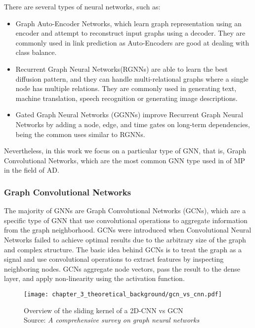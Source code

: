 There are several types of neural networks, such as:

\begin{itemize}
	
	\item Graph Auto-Encoder Networks, which learn graph representation using an encoder and attempt to reconstruct input graphs using a decoder. They are commonly used in link prediction as Auto-Encoders are good at dealing with class balance. 
	
	\item Recurrent Graph Neural Networks(RGNNs) are able to learn the best diffusion pattern, and they can handle multi-relational graphs where a single node has multiple relations. They are commonly used in generating text, machine translation, speech recognition or generating image descriptions.
	
	\item Gated Graph Neural Networks (GGNNs) improve Recurrent Graph Neural Networks by adding a node, edge, and time gates on long-term dependencies, being the common uses similar to RGNNs.
	
\end{itemize}

Nevertheless, in this work we focus on a particular type of GNN, that is, Graph Convolutional Networks, which are the most common GNN type used in of \ac{MP} in the field of \ac{AD}.

\subsubsection{Graph Convolutional Networks}
\label{subsubsec:3_gcns}

The majority of GNNs are Graph Convolutional Networks (GCNs), which are a specific type of GNN that use convolutional operations to aggregate information from the graph neighborhood. GCNs were introduced when Convolutional Neural Networks failed to achieve optimal results due to the arbitrary size of the graph and complex structure. The basic idea behind GCNs is to treat the graph as a signal and use convolutional operations to extract features by inspecting neighboring nodes. GCNs aggregate node vectors, pass the result to the dense layer, and apply non-linearity using the activation function. 

\begin{figure}[h]
	\centering
	\texttt{[image: chapter\_3\_theoretical\_background/gcn\_vs\_cnn.pdf]}
	\caption[Overview of the sliding kernel of a 2D-CNN vs GCN]{Overview of the sliding kernel of a 2D-CNN vs GCN \\ 
	Source: \textit{A comprehensive survey on graph neural networks} \cite{wu2020comprehensive}}
	\label{fig:chapter_3_theoretical_background/gcn_vs_cnn}
\end{figure}

